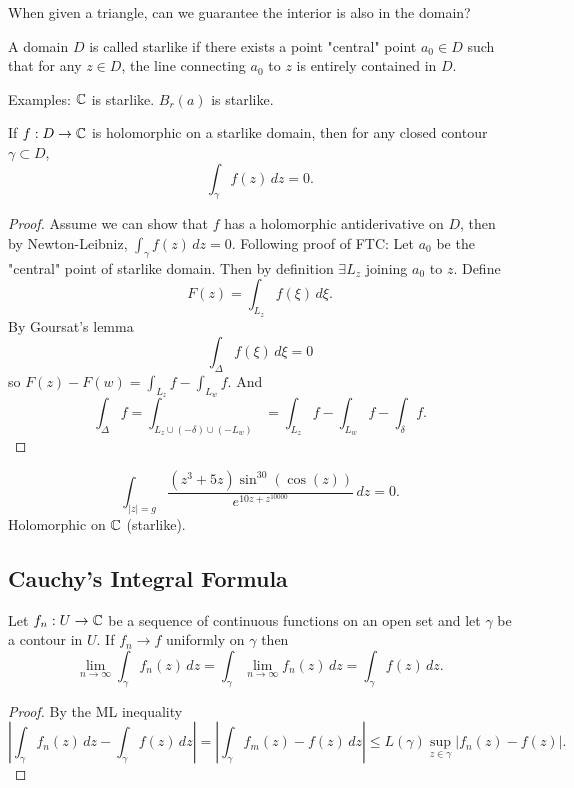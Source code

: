 \documentclass[10pt, a4paper]{article}
\begin{document}
When given a triangle,
can we guarantee the interior is also in the domain?

\begin{definition}
    A domain $D$ is called starlike if there exists a point
    "central"
    point $a_0 \in D$ such that for any $z \in D$,
    the line connecting $a_0$ to $z$ is entirely contained in $D$.
\end{definition}

Examples:
$\mathbb{C}$ is starlike.
$B_r(a)$ is starlike.

\begin{theorem}
    If $f : D \to \mathbb{C}$ is holomorphic on a starlike domain,
    then for any closed contour $\gamma \subset D$,
    \[
    \int_{\gamma}f(z)\,dz = 0.
    \]

    \begin{proof}
        Assume we can show that $f$ has a holomorphic antiderivative on $D$,
        then by Newton-Leibniz,
        $\int_{\gamma}f(z)\,dz = 0$.
        Following proof of FTC:
        Let $a_0$ be the
        "central"
        point of starlike domain.
        Then by definition $\exists L_z$ joining $a_0$ to $z$.
        Define
        \[
        F(z) = \int_{L_z}f(\xi)\,d\xi.
        \]
        By Goursat's lemma
        \[
        \int_{\Delta}f(\xi)\,d\xi = 0
        \]
        so $F(z) - F(w) = \int_{L_z}f - \int_{L_w}f$.
        And
        \[
        \int_{\Delta}f = \int_{L_z \cup (-\delta) \cup (-L_w)} = \int_{L_z}f - \int_{L_w}f - \int_{\delta}f.
        \]
    \end{proof}
\end{theorem}

\begin{example}
    \[
    \int_{|z| = g}\frac{(z ^ 3 + 5z)\sin ^ {30}(\cos(z))}{e ^ {10z + z ^ {10000}}}\,dz = 0.
    \]
    Holomorphic on $\mathbb{C}$
    (starlike).
\end{example}

\subsection{Cauchy's Integral Formula}

\begin{lemma}
    Let $f_n : U \to \mathbb{C}$ be a sequence of continuous functions on an open set and let $\gamma$ be a contour in $U$.
    If $f_n \to f$ uniformly on $\gamma$ then
    \[
    \lim_{n \to \infty}\int_{\gamma}f_n(z)\,dz = \int_{\gamma}\lim_{n \to \infty}f_n(z)\,dz = \int_{\gamma}f(z)\,dz.
    \]

    \begin{proof}
        By the ML inequality
        \[
        \left|\int_{\gamma}f_n(z)\,dz - \int_{\gamma}f(z)\,dz\right| = \left|\int_{\gamma}f_m(z) - f(z)\,dz\right| \leq L(\gamma)\sup_{z \in \gamma}|f_n(z) - f(z)|.
        \]
    \end{proof}
\end{lemma}
\end{document}
